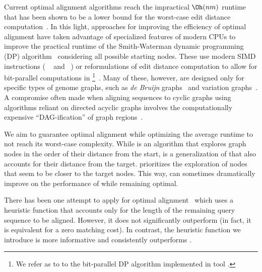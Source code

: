 Current optimal alignment algorithms reach the impractical $\Oh(nm)$ runtime
that has been shown to be a lower bound for the worst-case edit distance
computation~\cite{backurs2015edit}. In this light, approaches for improving the
efficiency of optimal alignment have taken advantage of specialized features of
modern CPUs to improve the practical runtime of the Smith-Waterman dynamic
programming (DP) algorithm~\cite{smith_comparison_1981} considering all possible
starting nodes. These use modern SIMD instructions (\eg
\vg~\cite{garrison_variation_2018} and \pasgal~\cite{jain_accelerating_2019}) or
reformulations of edit distance computation to allow for bit-parallel
computations in \graphaligner \footnote{We refer as \bitparallel to to the
bit-parallel DP algorithm implemented in \graphaligner tool
\cite{rautiainen_bitparallel_2019}.}~\cite{rautiainen_bitparallel_2019}. Many of
these, however, are designed only for specific types of genome graphs, such as
{\it de Bruijn}
graphs~\cite{liu_debga_2016,heydari_browniealigner_2018,limasset2019toward} and
variation graphs~\cite{garrison_variation_2018}. A compromise often made when
aligning sequences to cyclic graphs using algorithms reliant on directed acyclic
graphs involves the computationally expensive ``DAG-ification'' of graph
regions~\cite{kavya_sequence_2019,garrison_variation_2018}.

We aim to guarantee optimal alignment while optimizing the average runtime
to not reach its worst-case complexity. While \dijkstra is an algorithm that
explores graph nodes in the order of their distance from the start, \A is a
generalization of \dijkstra that also accounts for their distance from the
target. \A prioritizes the exploration of nodes that seem to be closer to the
target nodes. This way, \A can sometimes dramatically improve on the performance
of \dijkstra while remaining optimal.

There has been one attempt to apply \A for optimal
alignment~\cite{dox2018efficient} which uses a heuristic function that accounts
only for the length of the remaining query sequence to be aligned. However, it
does not significantly outperform \dijkstra (in fact, it is equivalent for
a zero matching cost).
%
In contrast, the heuristic function we introduce is more informative and
consistently outperforms \dijkstra.

